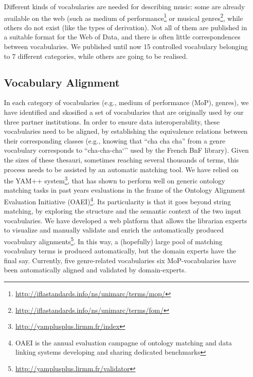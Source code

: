 \documentclass{article}
\begin{document}
Different kinds of vocabularies are needed for describing music: some are already available on the web (such as medium of performance\footnote{\url{http://iflastandards.info/ns/unimarc/terms/mop/}} or musical genres\footnote{\url{http://iflastandards.info/ns/unimarc/terms/fom/}}, while others do not exist (like the types of derivation). Not all of them are published in a suitable format for the Web of Data, and there is often little correspondences between vocabularies. We published until now 15 controlled vocabulary belonging to 7 different categories, while others are going to be realised. %

\subsection{Vocabulary Alignment}  
In each category of vocabularies (e.g., medium of performance (MoP), genres), we have identified and skosified a set of vocabularies that are originally used by our three partner institutions. In order to ensure data interoperability, these vocabularies need to be aligned, by establishing the equivalence relations between their corresponding classes (e.g., knowing that ``cha cha cha'' from a genre vocabulary corresponds to ``cha-cha-cha`'' used by the French BnF library). Given the sizes of these thesauri, sometimes reaching several thousands of terms, this process needs to be assisted by an automatic matching tool. We have relied on the YAM++ system\footnote{\url{http://yamplusplus.lirmm.fr/index}}, that has shown to perform well on generic ontology matching tasks in past years  evaluations in the frame of the Ontology Alignment Evaluation Initiative (OAEI)\footnote{OAEI is the annual evaluation campagne of ontology matching and data linking systems developing and sharing dedicated benchmarks}. Its particularity is that it goes beyond string matching, by exploring the structure and the semantic context of the two input vocabularies. We have developed a web platform that allows the librarian experts to visualize and manually validate and enrich the automatically produced vocabulary alignments\footnote{\url{http://yamplusplus.lirmm.fr/validator}}. In this way, a (hopefully) large pool of matching vocabulary terms is produced automatically, but the domain experts have the final say. Currently, five genre-related vocabularies six MoP-vocabularies have been automatically aligned and validated by domain-experts.
\end{document}
